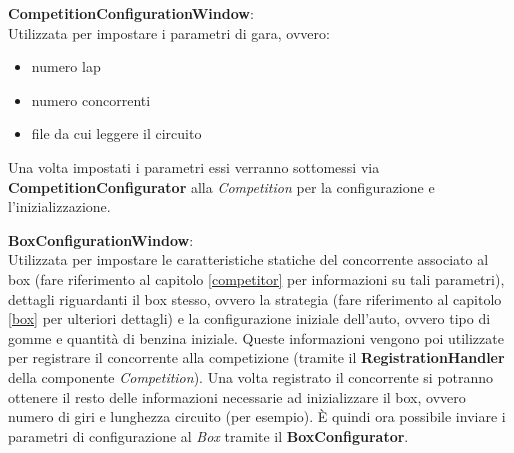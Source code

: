 \begin{description}
\item{\textbf{CompetitionConfigurationWindow}}:\\
Utilizzata per impostare i parametri di gara, ovvero:
\begin{itemize}
\item numero lap
\item numero concorrenti
\item file da cui leggere il circuito
\end{itemize}
Una volta impostati i parametri essi verranno sottomessi via \textbf{CompetitionConfigurator} alla \emph{Competition} per la
configurazione e l'inizializzazione.
\item{\textbf{BoxConfigurationWindow}}:\\
Utilizzata per impostare le caratteristiche statiche del concorrente associato al box 
(fare riferimento al capitolo \ref{competitor} per informazioni su tali parametri), dettagli riguardanti il box stesso, ovvero la strategia 
(fare riferimento al capitolo \ref{box} per ulteriori dettagli) e la configurazione iniziale dell'auto, ovvero tipo di gomme e quantit\`{a} di
benzina iniziale. Queste informazioni vengono poi utilizzate per registrare il concorrente alla competizione (tramite il \textbf{RegistrationHandler}
della componente \emph{Competition}). Una volta registrato il concorrente si potranno ottenere il resto delle informazioni necessarie
ad inizializzare il box, ovvero numero di giri e lunghezza circuito (per esempio). \`{E} quindi ora possibile inviare i parametri di configurazione
al \emph{Box} tramite il \textbf{BoxConfigurator}.
\end{description}
\newpage
